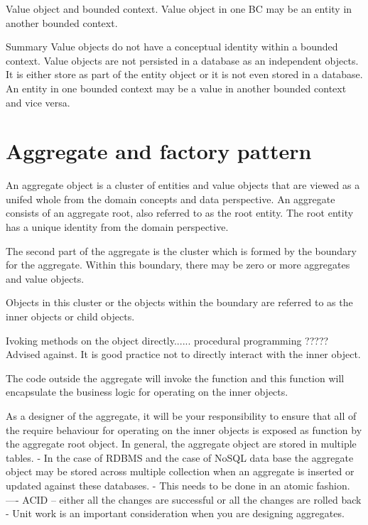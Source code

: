 \documentclass[a4paper, 11pt]{book}
\begin{document}
    Value object and bounded context.
    Value object in one BC may be an entity in another bounded context.

    Summary
    Value objects do not have a conceptual identity within a bounded context.
    Value objects are not persisted in a database as an independent objects.
    It is either store as part of the entity object or it is not even stored in a database.
    An entity in one bounded context may be a value in another bounded context and vice versa.



    \section{Aggregate and factory pattern}
    An aggregate object is a cluster of entities and value objects that are viewed as a unifed whole from the domain concepts and data perspective.
    An aggregate consists of an aggregate root, also referred to as the root entity.
    The root entity has a unique identity from the domain perspective.

    The second part of the aggregate is the cluster which is formed by the boundary for the aggregate.
    Within this boundary, there may be zero or more aggregates and value objects.

    Objects in this cluster or the objects within the boundary are referred to as the inner objects or child objects.

    Ivoking methods on the object directly...... procedural programming ????? Advised against.
    It is good practice not to directly interact with the inner object.

    The code outside the aggregate will invoke the function and this function will encapsulate the business logic for operating on the inner objects.

    As a designer of the aggregate, it will be your responsibility to ensure that all of the require behaviour for operating on the inner objects is exposed as function by the aggregate root object.
    In general, the aggregate object are stored in multiple tables.
    - In the case of RDBMS and the case of NoSQL data base the aggregate object may be stored across multiple collection when an aggregate is inserted or updated against these databases.
    - This needs to be done in an atomic fashion.
    ---- ACID -- either all the changes are successful or all the changes are rolled back %
    - Unit work is an important consideration when you are designing aggregates.
\end{document}
